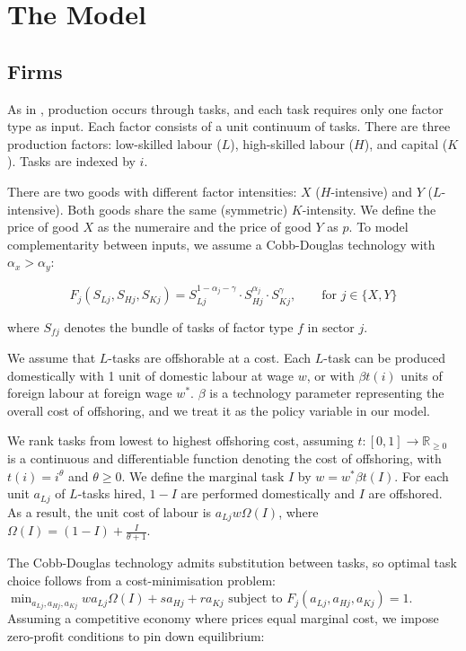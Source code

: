 \documentclass{article}
\begin{document}
\vspace{-0.6cm}
\section{The Model}
\vspace{-0.3cm}

\subsection{Firms}

As in \cite{grossman2008}, production occurs through tasks, and each task requires only one factor type as input. Each factor consists of a unit continuum of tasks. There are three production factors: low-skilled labour ($L$), high-skilled labour ($H$), and capital ($K$). Tasks are indexed by $i$.

There are two goods with different factor intensities: $X$ ($H$-intensive) and $Y$ ($L$-intensive). Both goods share the same (symmetric) $K$-intensity. We define the price of good $X$ as the numeraire and the price of good $Y$ as $p$. To model complementarity between inputs, we assume a Cobb-Douglas technology with $\alpha_x > \alpha_y$:

\vspace{-0.4cm}
$$
F_j(S_{Lj},S_{Hj},S_{Kj}) = S_{Lj}^{1-\alpha_j-\gamma}\cdot S_{Hj}^{\alpha_j}\cdot S_{Kj}^\gamma, \qquad \text{for $j\in\{X,Y\}$}
$$

\noindent where $S_{fj}$ denotes the bundle of tasks of factor type $f$ in sector $j$.

We assume that $L$-tasks are offshorable at a cost. Each $L$-task can be produced domestically with 1 unit of domestic labour at wage $w$, or with $\beta t(i)$ units of foreign labour at foreign wage $w^*$. $\beta$ is a technology parameter representing the overall cost of offshoring, and we treat it as the policy variable in our model.

We rank tasks from lowest to highest offshoring cost, assuming $t:[0,1]\rightarrow\mathbb{R}_{\geq 0}$ is a continuous and differentiable function denoting the cost of offshoring, with $t(i)=i^\theta$ and $\theta\geq 0$. We define the marginal task $I$ by $w=w^*\beta t(I)$. For each unit $a_{Lj}$ of $L$-tasks hired, $1-I$ are performed domestically and $I$ are offshored. As a result, the unit cost of labour is $a_{Lj}w\Omega(I)$, where $\Omega(I)=(1-I)+\frac{I}{\theta+1}$.

The Cobb-Douglas technology admits substitution between tasks, so optimal task choice follows from a cost-minimisation problem: $\min_{a_{Lj},a_{Hj},a_{Kj}} wa_{Lj}\Omega(I)+sa_{Hj}+ra_{Kj} \text{ subject to } F_j(a_{Lj},a_{Hj},a_{Kj})=1$. Assuming a competitive economy where prices equal marginal cost, we impose zero-profit conditions to pin down equilibrium:
\end{document}
